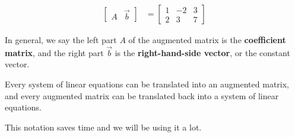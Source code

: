 \documentclass[11pt]{article}
\newcommand{\keyphrase}{\textbf}
\begin{document}
\begin{align*}
\left[
\begin{matrix}
A & \vec{b}
\end{matrix}
\right]
&=\left[ \begin{matrix}
1 & -2 & 3
\\
2 & 3 & 7
\end{matrix} \right]
\end{align*}

In general, we say the left part $A$ of the augmented matrix is the \keyphrase{coefficient matrix}, and the right part $\vec{b}$ is the \keyphrase{right-hand-side vector}, or the constant vector.

Every system of linear equations can be translated into an augmented matrix, and every augmented matrix can be translated back into a system of linear equations.

This notation saves time and we will be using it a lot.
\end{document}
